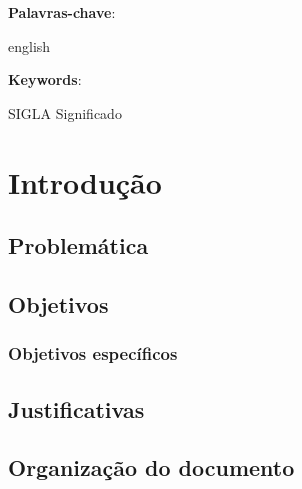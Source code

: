 \documentclass[
	12pt,	
	a4paper,			
	english,			
	french,				
	spanish,			
	brazil,
	oneside,
	sumario=tradicional
	]{abntex2}
\begin{document}
\setlength{\absparsep}{18pt} 

\begin{resumo}


 \textbf{Palavras-chave}: 
\end{resumo}

\begin{resumo}[Abstract]
 \begin{otherlanguage*}{english}
    
    \vspace{\onelineskip}
 
   \noindent 
   \textbf{Keywords}: 
 \end{otherlanguage*}
\end{resumo}

\listoffigures*
\cleardoublepage

\begin{siglas}
    \item[SIGLA] Significado
\end{siglas}

\tableofcontents*
\cleardoublepage


\textual

\chapter{Introdução}



\section{Problemática}

\section{Objetivos}

\subsection{Objetivos específicos}


\section{Justificativas}




\section{Organização do documento}
\end{document}
